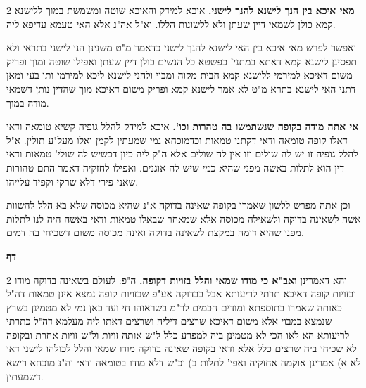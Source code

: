 \documentclass[12pt, openany]{book}
\newcommand{\sethebfont}{
\fontsize{10.5pt}{21.0pt} \selectfont
}
\newcommand{\twocol}[1]{
	{\sethebfont \begin{multicols}{2}
			#1
	\end{multicols}}	
}
\newcommand{\chapname}{}
\newcommand{\newchap}[1]{
	\addcontentsline{toc}{chapter}{#1}
	\renewcommand{\chapname}{#1}
		\begin{center}
			\textbf{%
\fontsize{16pt}{16pt}\selectfont
				#1}
		\end{center}
}
\begin{document}
\twocol{\textbf{מאי איכא בין הנך לישנא להנך לישני.}  איכא למידק והאיכא שוטה ומשמשת במוך ללישנא קמא כולן לשמאי דיין שעתן ולא ללשונות הללו. וא"ל אה"נ אלא האי טעמא עדיפא ליה.\par  ואפשר לפרש מאי איכא בין האי לישנא להנך לישני כדאמר מ"ט משנינן הני לישני בתראי ולא תפסינן לישנא קמא דאתא במתני' כפשטא כל הנשים כולן דיין שעתן ואפילו שוטה ומוך ופריק משום דאיכא למירמי ללישנא קמא חבית מקוה ומבוי ולהני לישנא ליכא למירמי ותו בעי ומאן דתני האי לישנא בתרא מ"ט לא אמר לישנא קמא ופריק משום דאיכא מוך שהדין נותן דשמאי מודה במוך. 
\par\textbf{אי אתה מודה בקופה שנשתמשו בה טהרות וכו'.}  איכא למידק להלל גופיה קשיא טומאה ודאי דאלו קופה טומאה ודאי דקתני טמאות וכדמוכחא נמי שמעתין לקמן ואלו מעל"ע תולין. א"ל להלל גופיה זו יש לה שולים וזו אין לה שולים אלא ה"ק ליה כיון דכשיש לה שולי' טמאות ודאי דין הוא לתלות באשה מפני שהיא כמי שיש לה אוגנים. ואפילו לחזקיה דאמר התם טהורות שאני פירי דלא שרקי וקפיד עלייהו.\par וכן אתה מפרש ללשון שאמרו בקופה שאינה בדוקה א"נ שהיא מכוסה שלא בא הלל להשוות אשה לשאינה בדוקה ולשאילה מכוסה אלא שמאחר שבאלו טמאות ודאי באשה היה לנו לתלות מפני שהיא דומה במקצת לשאינה בדוקה ואינה מכוסה משום דשכיחי בה דמים. 
\par}
\newchap{דף }
\twocol{והא דאמרינן \textbf{ואב"א כי מודו שמאי והלל בזויות דקופה.}  ה"פ: לעולם בשאינה בדוקה מודו ובזויות קופה דאיכא תרתי לריעותא אבל בבדוקה אע"פ שבזויות קופה נמצא אינן טמאות דה"ל כאותה שאמרו בתוספתא ומודים חכמים לר"מ בשראוהו חי ועד כאן נמי לא מטמינן בשרץ שנמצא במבוי אלא משום דאיכא שרצים דיליה ושרצים דאתו ליה מעלמא דה"ל כתרתי לריעותא הא לאו הכי לא מטמינן ביה למפרע כלל ל"ש אותה זויות ול"ש זויות אחרת ובקופה לא שכיחי ביה שרצים כלל אלא ודאי בקופה שאינה בדוקה מודו שמאי והלל לכולהו לישני דאי לא א) אמרינן אוקמה אחזקיה ואפי' לתלות ב) וכ"ש דלא מודו בטומאה ודאי וה"נ מוכחא רישא דשמעתין. 
\par}
\end{document}
